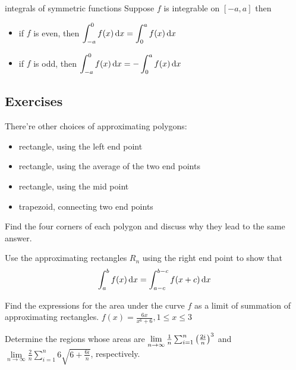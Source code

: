\documentclass[Calculus 1 Recitation.tex]{subfiles}
\begin{document}
\begin{myleftlinebox}
	integrals of symmetric functions
	\tcblower
	Suppose $f$ is integrable on $[-a,a]$ then
	\begin{itemize}
		\item if $f$ is even, then $\displaystyle \int_{-a}^0 f(x)\,\mathrm{d} x=\int_0^a f(x)\,\mathrm{d} x$
		\item if $f$ is odd, then $\displaystyle \int_{-a}^0 f(x)\,\mathrm{d} x=-\int_0^a f(x)\,\mathrm{d} x$
	\end{itemize}
\end{myleftlinebox}

\subsection{Exercises}
\begin{myleftlinebox}
	There're other choices of approximating polygons:
	\begin{itemize}
		\item rectangle, using the left end point
		\item rectangle, using the average of the two end points
		\item rectangle, using the mid point
		\item trapezoid, connecting two end points
	\end{itemize}
	Find the four corners of each polygon and discuss why they lead to the same answer.
	\tcblower
	\vspace{2em}
\end{myleftlinebox}

\begin{myleftlinebox}
	Use the approximating rectangles $R_n$ using the right end point to show that
	\[\int_a^b f(x) \,\mathrm{d} x = \int_{a-c}^{b-c} f(x+c)\,\mathrm{d} x\]
	\tcblower
	\vspace{2em}
\end{myleftlinebox}

\begin{myleftlinebox}
	Find the expressions for the area under the curve $f$ as a limit of summation of approximating rectangles. $f(x)=\frac{6x}{x^6+6}, 1\leq x\leq 3$
	\tcblower
	\vspace{2em}
\end{myleftlinebox}

\begin{myleftlinebox}
	Determine the regions whose areas are $\lim\limits_{n\to\infty} \frac{1}{n}\sum_{i=1}^n \left( \frac{2i}{n} \right)^3$ and $\lim\limits_{n\to\infty} \frac{2}{n}\sum_{i=1}^n 6\sqrt{6+\frac{6i}{n}}$, respectively.
	\tcblower
	\vspace{2em}
\end{myleftlinebox}
\end{document}
